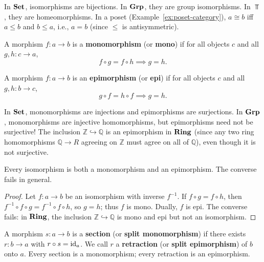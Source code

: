 \begin{example}
In $\mathbf{Set}$, isomorphisms are bijections. In $\mathbf{Grp}$, they are group isomorphisms. In $\Top$, they are homeomorphisms. In a poset (Example~\ref{ex:poset-category}), $a \cong b$ iff $a \leq b$ and $b \leq a$, i.e., $a = b$ (since $\leq$ is antisymmetric).
\end{example}

\begin{definition}[Monomorphism]
A morphism $f: a \to b$ is a \textbf{monomorphism} (or \textbf{mono}) if for all objects $c$ and all $g, h: c \to a$,
\[
  f \circ g = f \circ h \implies g = h.
\]
\end{definition}

\begin{definition}[Epimorphism]
A morphism $f: a \to b$ is an \textbf{epimorphism} (or \textbf{epi}) if for all objects $c$ and all $g, h: b \to c$,
\[
  g \circ f = h \circ f \implies g = h.
\]
\end{definition}

\begin{remark}
In $\mathbf{Set}$, monomorphisms are injections and epimorphisms are surjections. In $\mathbf{Grp}$, monomorphisms are injective homomorphisms, but epimorphisms need not be surjective! The inclusion $\mathbb{Z} \hookrightarrow \mathbb{Q}$ is an epimorphism in $\mathbf{Ring}$ (since any two ring homomorphisms $\mathbb{Q} \to R$ agreeing on $\mathbb{Z}$ must agree on all of $\mathbb{Q}$), even though it is not surjective.
\end{remark}

\begin{proposition}
Every isomorphism is both a monomorphism and an epimorphism. The converse fails in general.
\end{proposition}

\begin{proof}
Let $f: a \to b$ be an isomorphism with inverse $f^{-1}$. If $f \circ g = f \circ h$, then $f^{-1} \circ f \circ g = f^{-1} \circ f \circ h$, so $g = h$; thus $f$ is mono. Dually, $f$ is epi. The converse fails: in $\mathbf{Ring}$, the inclusion $\mathbb{Z} \hookrightarrow \mathbb{Q}$ is mono and epi but not an isomorphism.
\end{proof}

\begin{definition}
A morphism $s: a \to b$ is a \textbf{section} (or \textbf{split monomorphism}) if there exists $r: b \to a$ with $r \circ s = \mathrm{id}_a$. We call $r$ a \textbf{retraction} (or \textbf{split epimorphism}) of $b$ onto $a$. Every section is a monomorphism; every retraction is an epimorphism.
\end{definition}

